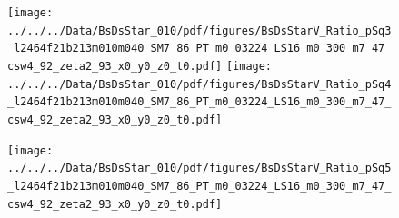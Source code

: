 \documentclass[a4paper,10pt]{article}
\begin{document}
\clearpage
\begin{figure}[p]
 \texttt{[image: ../../../Data/BsDsStar\_010/pdf/figures/BsDsStarV\_Ratio\_pSq3\_l2464f21b213m010m040\_SM7\_86\_PT\_m0\_03224\_LS16\_m0\_300\_m7\_47\_csw4\_92\_zeta2\_93\_x0\_y0\_z0\_t0.pdf]} 
 \texttt{[image: ../../../Data/BsDsStar\_010/pdf/figures/BsDsStarV\_Ratio\_pSq4\_l2464f21b213m010m040\_SM7\_86\_PT\_m0\_03224\_LS16\_m0\_300\_m7\_47\_csw4\_92\_zeta2\_93\_x0\_y0\_z0\_t0.pdf]} 
 \end{figure}
\begin{figure}[p]
 \texttt{[image: ../../../Data/BsDsStar\_010/pdf/figures/BsDsStarV\_Ratio\_pSq5\_l2464f21b213m010m040\_SM7\_86\_PT\_m0\_03224\_LS16\_m0\_300\_m7\_47\_csw4\_92\_zeta2\_93\_x0\_y0\_z0\_t0.pdf]} 
 \end{figure}
\clearpage
\end{document}
